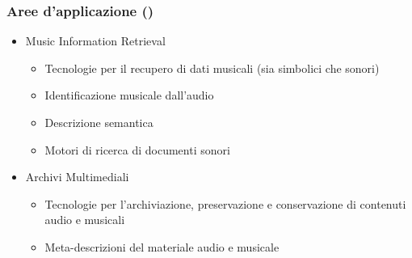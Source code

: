 \begin{frame}
    \frametitle{Aree d'applicazione ()}

    \begin{itemize}
        \item{Music Information Retrieval}
            \begin{itemize}
                \item{Tecnologie per il recupero di dati musicali (sia
                    simbolici che sonori)}
                \item{Identificazione musicale dall'audio}
                \item{Descrizione semantica}
                \item{Motori di ricerca di documenti sonori}
            \end{itemize}
        \item{Archivi Multimediali}
            \begin{itemize}
                \item{Tecnologie per l'archiviazione, preservazione e
                    conservazione di contenuti audio e musicali}
                \item{Meta-descrizioni del materiale audio e musicale}
            \end{itemize}
    \end{itemize}
    
\end{frame}

